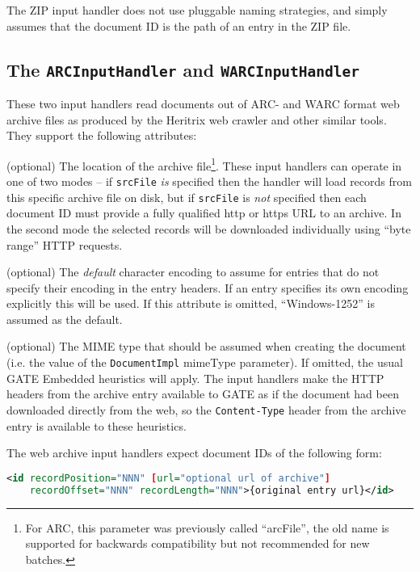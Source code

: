 The ZIP input handler does not use pluggable naming strategies, and simply
assumes that the document ID is the path of an entry in the ZIP file.

\subsection{The {\tt ARCInputHandler} and {\tt WARCInputHandler}}
\label{sec:batch-def:arc}

These two input handlers read documents out of ARC- and WARC format web archive
files as produced by the Heritrix web crawler and other similar tools.  They
support the following attributes:

\bde
\item[srcFile] (optional) The location of the archive file\footnote{For ARC,
  this parameter was previously called ``arcFile'', the old name is supported
  for backwards compatibility but not recommended for new batches.}.  These
  input handlers can operate in one of two modes -- if \verb!srcFile! \emph{is}
  specified then the handler will load records from this specific archive file
  on disk, but if \verb!srcFile! is \emph{not} specified then each document ID
  must provide a fully qualified http or https URL to an archive.  In the
  second mode the selected records will be downloaded individually using ``byte
  range'' HTTP requests.
\item[defaultEncoding] (optional) The {\em default} character encoding to
  assume for entries that do not specify their encoding in the entry
  headers.  If an entry specifies its own encoding explicitly this will be
  used.  If this attribute is omitted, ``Windows-1252'' is assumed as the
  default.
\item[mimeType] (optional) The MIME type that should be assumed when creating
  the document (i.e. the value of the \verb!DocumentImpl! mimeType parameter).
  If omitted, the usual GATE Embedded heuristics will apply.  The input
  handlers make the HTTP headers from the archive entry available to GATE as if
  the document had been downloaded directly from the web, so the
  \verb!Content-Type! header from the archive entry is available to these
  heuristics.
\ede

The web archive input handlers expect document IDs of the following form:
\begin{lstlisting}[language=XML]
<id recordPosition="NNN" [url="optional url of archive"]
    recordOffset="NNN" recordLength="NNN">{original entry url}</id>
\end{lstlisting}

